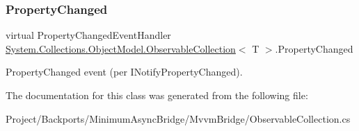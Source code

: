 \subsubsection{\texorpdfstring{Property\+Changed}{PropertyChanged}}
{\footnotesize\ttfamily virtual Property\+Changed\+Event\+Handler \hyperlink{class_system_1_1_collections_1_1_object_model_1_1_observable_collection}{System.\+Collections.\+Object\+Model.\+Observable\+Collection}$<$ T $>$.Property\+Changed\hspace{0.3cm}{\ttfamily [protected]}}



Property\+Changed event (per I\+Notify\+Property\+Changed). 



The documentation for this class was generated from the following file\+:\begin{DoxyCompactItemize}
\item 
Project/\+Backports/\+Minimum\+Async\+Bridge/\+Mvvm\+Bridge/Observable\+Collection.\+cs\end{DoxyCompactItemize}
